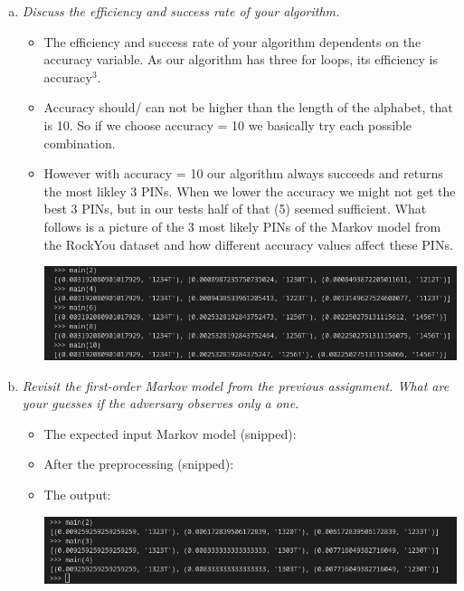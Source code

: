 \begin{enumerate}[(a)]
\begin{enumerate}[1.]
        
    \end{enumerate}
    

    \item {\itshape Discuss the efficiency and success rate of your algorithm.}
   \begin{itemize}
       \item The efficiency and success rate of your algorithm dependents on the accuracy variable. As our algorithm has three for loops, its efficiency is accuracy$^{3}$. 
       \item Accuracy should/ can not be higher than the length of the alphabet, that is 10. So if we choose accuracy = 10 we basically try each possible combination. 
       \item However with accuracy = 10 our algorithm always succeeds and returns the most likley 3 PINs. When we lower the accuracy we might not get the best 3 PINs, but in our tests half of that (5) seemed sufficient. What follows is a picture of the 3 most likely PINs of the Markov model from the RockYou dataset and how different accuracy values affect these PINs.
       
       \includegraphics[width=\linewidth]{src/u5/output.png}

   \end{itemize}

\newpage
    \item {\itshape Revisit the first-order Markov model from the previous assignment. What are your guesses if the adversary observes only a one.}
   \begin{itemize}
       \item The expected input Markov model (snipped):
       
       
       \item After the preprocessing (snipped):
       
       
       \item The output:
       
       \includegraphics[width=\linewidth]{src/u5/output2.png}
   \end{itemize}
   
    
\end{enumerate}

